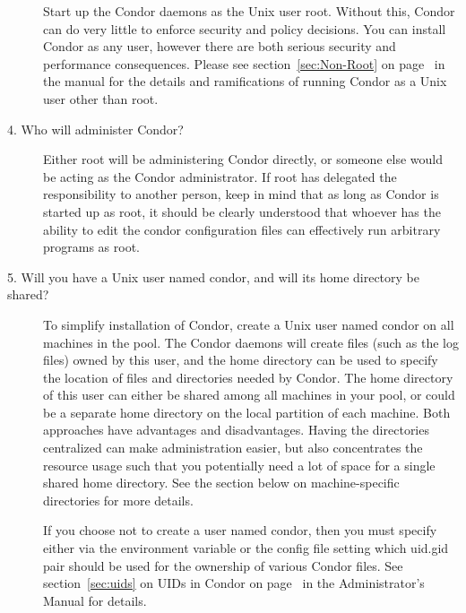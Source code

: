 \begin{description}
Start up the Condor daemons as the Unix user root.
Without this,
Condor can do very little to enforce security and policy
decisions.
You can install Condor as any user,
however there are both serious security and performance consequences.
Please see section~\ref{sec:Non-Root} on page~\pageref{sec:Non-Root}
in the manual for the details and ramifications of
running Condor as a Unix user other than root.

\item[4. Who will administer Condor?]



Either root will be administering Condor directly, or someone else
would be acting as the Condor administrator.  If root has delegated
the responsibility to another person, keep in mind that as long as
Condor is started up as root, it should be clearly understood that
whoever has the ability to edit the condor configuration files can
effectively run arbitrary programs as root.


\item[5. Will you have a Unix user named condor, and will its home
directory be shared?]

To simplify installation of Condor,
create a Unix user named condor on all machines in the pool.
The Condor daemons will create files
(such as the log files) owned by this user,
and the home directory can be used to specify the location of files
and directories needed by Condor.  The home directory of this user can
either be shared among all machines in your pool, or could be a
separate home directory on the local partition of each machine.  Both
approaches have advantages and disadvantages.  Having the directories
centralized can make administration easier, but also concentrates the
resource usage such that you potentially need a lot of space for a
single shared home directory.  See the section below on
machine-specific directories for more details.

If you choose not to create a user named condor,
then you must specify either via the
 environment variable or the 
config file setting which uid.gid pair should be used for
the ownership of various Condor files.  
See section~\ref{sec:uids} on UIDs in Condor on
page~\pageref{sec:uids} in the Administrator's Manual for details.


\end{description}

